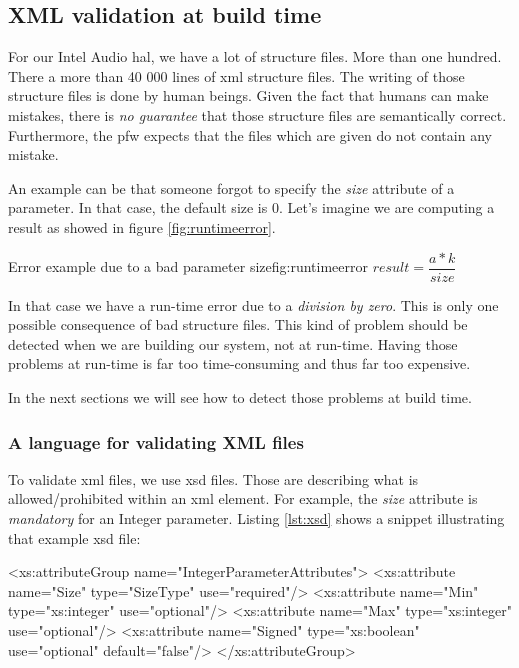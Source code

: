 \subsection{XML validation at build time}

For our Intel Audio \gls{hal}, we have a lot of structure files. More than one hundred.
There a more than 40 000 lines of \gls{xml} structure files.
The writing of those structure files is done by human beings. Given the fact
that humans can make mistakes, there is \emph{no guarantee} that those structure files are semantically correct.
Furthermore, the \gls{pfw} expects that the files which are given do not contain any mistake.

An example can be that someone forgot to specify the \emph{size} attribute of a parameter.
In that case, the default size is $0$. Let's imagine we are computing a result as showed in figure \ref{fig:runtimeerror}.

\begin{figureGraphics}{Error example due to a bad parameter size}{fig:runtimeerror}
    $result = \dfrac{a*k}{size}$
    \vspace{0.3cm}
\end{figureGraphics}

In that case we have a run-time error due to a \emph{division by zero}. This is only one possible consequence of bad structure files.
This kind of problem should be detected when we are building our system, not at run-time. Having those problems at
run-time is far too time-consuming and thus far too expensive.

In the next sections we will see how to detect those problems at build time.

\subsubsection{A language for validating XML files}

To validate \gls{xml} files, we use \gls{xsd} files.
Those are describing what is allowed/prohibited within an \gls{xml} element. For example, the \emph{size} attribute is
\emph{mandatory} for an Integer parameter.
Listing \ref{lst:xsd} shows a snippet illustrating that example \gls{xsd} file:

\begin{code}[language=XML, caption=XSD rules for an Integer parameter, label=lst:xsd]
<xs:attributeGroup name="IntegerParameterAttributes">
    <xs:attribute name="Size" type="SizeType" use="required"/>
    <xs:attribute name="Min" type="xs:integer" use="optional"/>
    <xs:attribute name="Max" type="xs:integer" use="optional"/>
    <xs:attribute name="Signed" type="xs:boolean" use="optional" default="false"/>
</xs:attributeGroup>
\end{code}

